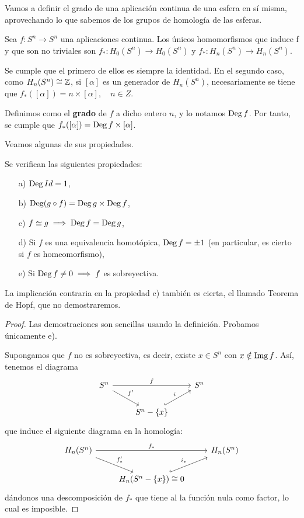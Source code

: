 Vamos a definir el grado de una aplicación continua de una esfera en sí misma, aprovechando lo que sabemos
de los grupos de homología de las esferas.

Sea $f \colon S^n \to S^n$ una aplicaciones continua. Los únicos homomorfismos que induce f y que son no triviales son
$f_* \colon H_0(S^n) \to H_0(S^n)$ y $f_* \colon H_n(S^n) \to H_n(S^n)$.

Se cumple que el primero de ellos es siempre la identidad. En el segundo caso, como $H_n(S^n) \cong \mathbb{Z}$, si $[\alpha]$ es un
generador de $H_n(S^n)$, necesariamente se tiene que $f_*([\alpha]) = n \times [\alpha], \quad n \in Z$.

Definimos como el \textbf{grado} de $f$ a dicho entero $n$, y lo notamos $\operatorname{Deg} f$. Por tanto, se cumple que $f_*([\alpha]) = \operatorname{Deg} f \times [\alpha]$.

Veamos algunas de sus propiedades.

\begin{proposition}[Propiedades]
  Se verifican las siguientes propiedades:
  \begin{itemize}
    \item[a)] $\operatorname{Deg} Id = 1$,
    \item[b)] $\operatorname{Deg} (g \circ f) = \operatorname{Deg} g \times \operatorname{Deg} f$,
    \item[c)] $f \simeq g \implies \operatorname{Deg} f = \operatorname{Deg} g$,
    \item[d)] Si $f$ es una equivalencia homotópica, $\operatorname{Deg} f = \pm 1$ (en particular, es cierto si $f$ es homeomorfismo),
    \item[e)] Si $\operatorname{Deg} f \neq 0 \implies f$ es sobreyectiva.
  \end{itemize}
  La implicación contraria en la propiedad c) también es cierta, el llamado Teorema de Hopf, que no demostraremos.
\end{proposition}

\begin{proof}
  Las demostraciones son sencillas usando la definición. Probamos únicamente e).

  Supongamos que $f$ no es sobreyectiva, es decir, existe $x \in S^n$ con $x \notin \operatorname{Img} f$. Así, tenemos el diagrama
  \[ \begin{tikzcd}
    S^n  \arrow{dr}{f'} \arrow{rr}{f} & & S^n  \\
    & S^n - \{x\} \arrow[hookrightarrow]{ur}{i}
  \end{tikzcd} \]
  que induce el siguiente diagrama en la homología:
  \[ \begin{tikzcd}
    H_n(S^n)  \arrow{dr}{f'_*} \arrow{rr}{f_*} & & H_n(S^n)  \\
    & H_n(S^n - \{x\}) \cong 0 \arrow[hookrightarrow]{ur}{i_*}
  \end{tikzcd} \]
  dándonos una descomposición de $f_*$ que tiene al la función nula como factor, lo cual es imposible.
\end{proof}

